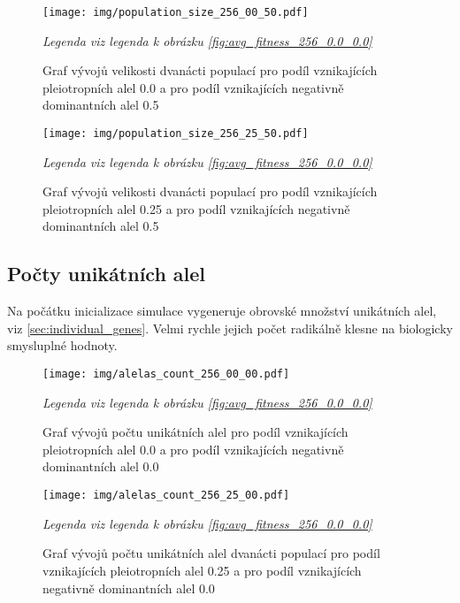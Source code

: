 \begin{figure}[H]
\caption{Graf vývojů velikosti dvanácti populací pro podíl vznikajících pleiotropních alel 0.0 a pro podíl
    vznikajících negativně dominantních alel 0.5}
\centering
\texttt{[image: img/population\_size\_256\_00\_50.pdf]}

\label{fig:population_size_256_0.0_0.5}

\textit{Legenda viz legenda k obrázku \ref{fig:avg_fitness_256_0.0_0.0}}

\end{figure}

\begin{figure}[H]
\caption{Graf vývojů velikosti dvanácti populací pro podíl vznikajících pleiotropních alel 0.25 a pro podíl
    vznikajících negativně dominantních alel 0.5}
\centering
\texttt{[image: img/population\_size\_256\_25\_50.pdf]}

\label{fig:population_size_256_0.25_0.5}

\textit{Legenda viz legenda k obrázku \ref{fig:avg_fitness_256_0.0_0.0}}

\end{figure}

\subsection{Počty unikátních alel}

Na počátku inicializace simulace vygeneruje obrovské množství unikátních alel, viz \ref{sec:individual_genes}.
Velmi rychle jejich počet radikálně klesne na biologicky smysluplné hodnoty.


\begin{figure}[H]
\caption{Graf vývojů počtu unikátních alel pro podíl vznikajících pleiotropních alel 0.0 a pro podíl
         vznikajících negativně dominantních alel 0.0}
\centering
\texttt{[image: img/alelas\_count\_256\_00\_00.pdf]}

\label{fig:alelas_count_256_0.0_0.0}

\textit{Legenda viz legenda k obrázku \ref{fig:avg_fitness_256_0.0_0.0}}

\end{figure}


\begin{figure}[H]
\caption{Graf vývojů počtu unikátních alel dvanácti populací pro podíl vznikajících pleiotropních alel 0.25 a pro podíl
        vznikajících negativně dominantních alel 0.0}
\centering
\texttt{[image: img/alelas\_count\_256\_25\_00.pdf]}

\label{fig:alelas_count_256_0.25_0.0}

\textit{Legenda viz legenda k obrázku \ref{fig:avg_fitness_256_0.0_0.0}}

\end{figure}

